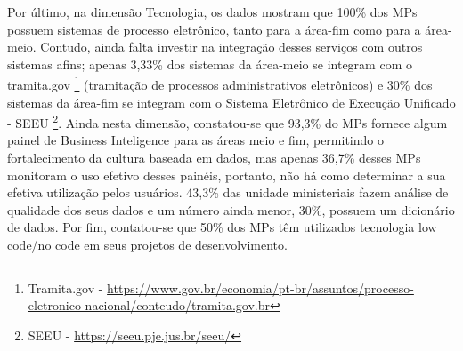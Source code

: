 Por último, na dimensão Tecnologia, os dados mostram que 100\% dos MPs possuem sistemas de processo eletrônico, tanto para a área-fim como para a área-meio. Contudo, ainda falta investir na integração desses serviços com outros sistemas afins; apenas 3,33\% dos sistemas da área-meio se integram com o tramita.gov \footnote{Tramita.gov - \url{https://www.gov.br/economia/pt-br/assuntos/processo-eletronico-nacional/conteudo/tramita.gov.br}} (tramitação de processos administrativos eletrônicos) e 30\% dos sistemas da área-fim se integram com o Sistema Eletrônico de Execução Unificado - SEEU \footnote{SEEU - \url{https://seeu.pje.jus.br/seeu/}}. Ainda nesta dimensão, constatou-se que 93,3\% do MPs fornece algum painel de Business Inteligence para as áreas meio e fim, permitindo o fortalecimento da cultura baseada em dados, mas apenas 36,7\% desses MPs monitoram o uso efetivo desses painéis, portanto, não há como determinar a sua efetiva utilização pelos usuários. 43,3\% das unidade ministeriais fazem análise de qualidade dos seus dados e um número ainda menor, 30\%, possuem um dicionário de dados. Por fim, contatou-se que 50\% dos MPs têm utilizados tecnologia low code/no code em seus projetos de desenvolvimento.
